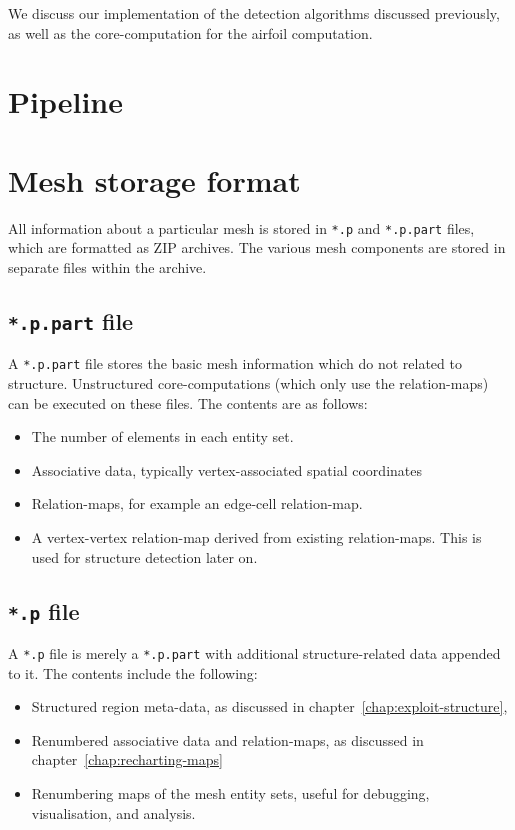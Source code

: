 \label{chap:implementation}
We discuss our implementation of the detection algorithms discussed previously, as well as the core-computation for the airfoil computation.

\section{Pipeline}

\section{Mesh storage format}
All information about a particular mesh is stored in \texttt{*.p} and \texttt{*.p.part} files, which are formatted as ZIP archives. The various mesh components are stored in separate files within the archive.

\subsection{\texttt{*.p.part} file}
\label{subsec:p-part}
A \texttt{*.p.part} file stores the basic mesh information which do not related to structure. Unstructured core-computations (which only use the relation-maps) can be executed on these files. The contents are as follows:
\begin{itemize}
\item The number of elements in each entity set.
\item Associative data, typically vertex-associated spatial coordinates
\item Relation-maps, for example an edge-cell relation-map.
\item A vertex-vertex relation-map derived from existing relation-maps. This is used for structure detection later on.
\end{itemize}

\subsection{\texttt{*.p} file}
A \texttt{*.p} file is merely a \texttt{*.p.part} with additional structure-related data appended to it. The contents include the following:
\begin{itemize}
\item Structured region meta-data, as discussed in chapter~\ref{chap:exploit-structure},
\item Renumbered associative data and relation-maps, as discussed in chapter~\ref{chap:recharting-maps}
\item Renumbering maps of the mesh entity sets, useful for debugging, visualisation, and analysis.
\end{itemize}



